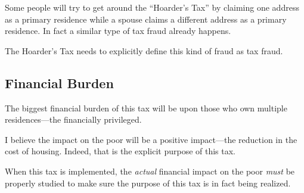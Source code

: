 Some people will try to get around the ``Hoarder's Tax'' by claiming one address as a primary residence while a spouse claims a different address as a primary residence. In fact a similar type of tax fraud already happens.

The Hoarder's Tax needs to explicitly define this kind of fraud as tax fraud.

\subsection{Financial Burden}

The biggest financial burden of this tax will be upon those who own multiple residences---the financially privileged.

I believe the impact on the poor will be a positive impact---the reduction in the cost of housing. Indeed, that is the explicit purpose of this tax.

When this tax is implemented, the \emph{actual} financial impact on the poor \emph{must} be properly studied to make sure the purpose of this tax is in fact being realized.
